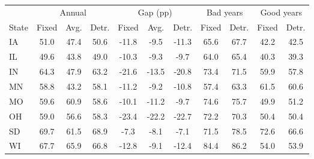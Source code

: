 \begin{tabular}{lcccccccccc}
\toprule
 & \multicolumn{3}{c}{Annual} & \multicolumn{3}{c}{Gap (pp)} & \multicolumn{2}{c}{Bad years} & \multicolumn{2}{c}{Good years}\\
\cmidrule(lr){2-4}\cmidrule(lr){5-7}\cmidrule(lr){8-9}\cmidrule(lr){10-11}
State & Fixed & Avg. & Detr. & Fixed & Avg. & Detr. & Fixed & Detr. & Fixed & Detr.\\
\midrule
IA & 51.0 & 47.4 & 50.6 & -11.8 & -9.5 & -11.3 & 65.6 & 67.7 & 42.2 & 42.5 \\
IL & 49.6 & 43.8 & 49.0 & -10.3 & -9.3 & -9.7 & 64.0 & 65.4 & 40.3 & 39.3 \\
IN & 64.3 & 47.9 & 63.2 & -21.6 & -13.5 & -20.8 & 73.4 & 71.5 & 59.9 & 57.8 \\
MN & 58.8 & 43.2 & 58.1 & -11.2 & -9.2 & -10.8 & 57.4 & 63.3 & 61.5 & 60.6 \\
MO & 59.6 & 60.9 & 58.6 & -10.1 & -11.2 & -9.7 & 74.6 & 75.7 & 49.9 & 51.2 \\
OH & 59.0 & 56.6 & 58.3 & -23.4 & -22.2 & -22.7 & 72.2 & 70.3 & 50.4 & 50.4 \\
SD & 69.7 & 61.5 & 68.9 & -7.3 & -8.1 & -7.1 & 71.5 & 78.5 & 72.6 & 66.6 \\
WI & 67.7 & 65.9 & 66.8 & -12.8 & -9.1 & -12.4 & 84.4 & 86.2 & 54.0 & 53.9 \\
\bottomrule
\end{tabular}
